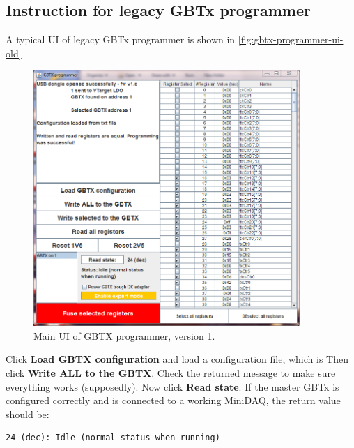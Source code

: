 \subsection{Instruction for legacy GBTx programmer}
\label{appx:legacy-gbtx-programmer}

A typical UI of legacy GBTx programmer is shown in
\autoref{fig:gbtx-programmer-ui-old}

\begin{figure}[!ht]
	\centering
	\includegraphics[width=0.9\textwidth]{res/gbtx_programmer_v1_ui.png}
	\caption{Main UI of GBTX programmer, version 1.}
	\label{fig:gbtx-programmer-ui-old}
\end{figure}

Click \textbf{Load GBTX configuration} and load a configuration file, which is
Then click \textbf{Write ALL to the GBTX}. Check the returned message to make
sure everything works (supposedly).
Now click \textbf{Read state}.
If the master GBTx is configured correctly and is connected to a working
MiniDAQ, the return value should be:

\begin{lstlisting}
24 (dec): Idle (normal status when running)
\end{lstlisting}
